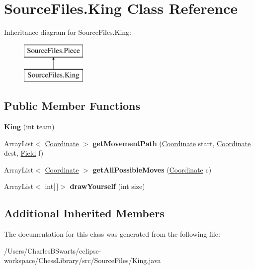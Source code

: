 \hypertarget{class_source_files_1_1_king}{}\section{Source\+Files.\+King Class Reference}
\label{class_source_files_1_1_king}
Inheritance diagram for Source\+Files.\+King\+:\begin{figure}[H]
\begin{center}
\leavevmode
\includegraphics[height=2.000000cm]{class_source_files_1_1_king}
\end{center}
\end{figure}
\subsection*{Public Member Functions}
\begin{DoxyCompactItemize}
\item 
\mbox{\label{class_source_files_1_1_king_a9450f56d32e3b20edd87b76344cd086d}} 
{\bfseries King} (int team)
\item 
\mbox{\label{class_source_files_1_1_king_a55d2cf7f6205db10e7d221b1cdf27bfb}} 
Array\+List$<$ \mbox{\hyperlink{class_source_files_1_1_coordinate}{Coordinate}} $>$ {\bfseries get\+Movement\+Path} (\mbox{\hyperlink{class_source_files_1_1_coordinate}{Coordinate}} start, \mbox{\hyperlink{class_source_files_1_1_coordinate}{Coordinate}} dest, \mbox{\hyperlink{class_source_files_1_1_field}{Field}} f)
\item 
\mbox{\label{class_source_files_1_1_king_ad48c205a3719de5d9a4637ae3b779df7}} 
Array\+List$<$ \mbox{\hyperlink{class_source_files_1_1_coordinate}{Coordinate}} $>$ {\bfseries get\+All\+Possible\+Moves} (\mbox{\hyperlink{class_source_files_1_1_coordinate}{Coordinate}} c)
\item 
\mbox{\label{class_source_files_1_1_king_ac8459ed5a52a831e563b4d5b36d75716}} 
Array\+List$<$ int\mbox{[}$\,$\mbox{]}$>$ {\bfseries draw\+Yourself} (int size)
\end{DoxyCompactItemize}
\subsection*{Additional Inherited Members}


The documentation for this class was generated from the following file\+:\begin{DoxyCompactItemize}
\item 
/\+Users/\+Charles\+B\+Swarts/eclipse-\/workspace/\+Chess\+Library/src/\+Source\+Files/King.\+java\end{DoxyCompactItemize}
